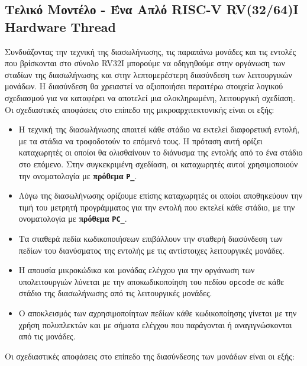\documentclass[11pt]{extarticle}
\begin{document}
\subsection{Τελικό Μοντέλο - Ένα Απλό RISC-V RV(32/64)I Hardware Thread}
Συνδυάζοντας την τεχνική της διασωλήνωσης, τις παραπάνω μονάδες και τις εντολές που βρίσκονται στο σύνολο RV32I μπορούμε να οδηγηθούμε στην οργάνωση των σταδίων της διασωλήνωσης και στην λεπτομερέστερη διασύνδεση των λειτουργικών μονάδων.
Η διασύνδεση θα χρειαστεί να αξιοποιήσει περαιτέρω στοιχεία λογικού σχεδιασμού για να καταφέρει να αποτελεί μια ολοκληρωμένη, λειτουργική σχεδίαση.
\newpage
Οι σχεδιαστικές αποφάσεις στο επίπεδο της μικροαρχιτεκτονικής είναι οι εξής:
\begin{itemize}
    \item Η τεχνική της διασωλήνωσης απαιτεί κάθε στάδιο να εκτελεί διαφορετική εντολή, με τα στάδια να τροφοδοτούν το επόμενό τους.
    Η πρόταση αυτή ορίζει καταχωρητές οι οποίοι θα ολισθαίνουν το διάνυσμα της εντολής από το ένα στάδιο στο επόμενο.
    Στην συγκεκριμένη σχεδίαση, οι καταχωρητές αυτοί χρησιμοποιούν την ονοματολογία με \textbf{πρόθεμα} \texttt{\textbf{P\_}}.
    \item Λόγω της διασωλήνωσης ορίζουμε επίσης καταχωρητές οι οποίοι αποθηκεύουν την τιμή του μετρητή προγράμματος για την εντολή που εκτελεί κάθε στάδιο, με την ονοματολογία με \textbf{πρόθεμα} \texttt{\textbf{PC\_}}.
    \item Τα σταθερά πεδία κωδικοποιήσεων επιβάλλουν την σταθερή διασύνδεση των πεδίων του διανύσματος της εντολής με τις αντίστοιχες λειτουργικές μονάδες.
    \item Η απουσία μικροκώδικα και μονάδας ελέγχου για την οργάνωση των υπολειτουργιών λύνεται με την αποκωδικοποίηση του πεδίου \texttt{opcode} σε κάθε στάδιο της διασωλήνωσης από τις λειτουργικές μονάδες.
    \item Ο αποκλεισμός των αχρησιμοποίητων πεδίων κάθε κωδικοποίησης γίνεται με την χρήση πολυπλεκτών και με σήματα ελέγχου που παράγονται ή αναγιγνώσκονται από τις μονάδες.
\end{itemize}
Οι σχεδιαστικές αποφάσεις στο επίπεδο της διασύνδεσης των μονάδων είναι οι εξής:
\end{document}
